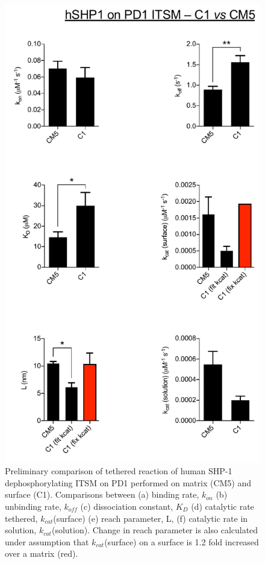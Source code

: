 \documentclass[../../AdvancementSummary.tex]{subfiles}
\begin{document}
\begin{figure}[H]
	\begin{center}
		\includegraphics[scale=0.5]{ResultsFigures/ExperimentalDataPlots/hSHP1_on_PD1_ITSM_CM5_vs_C1.pdf}
	\end{center}
	\caption{Preliminary comparison of tethered reaction of human SHP-1 dephosphorylating ITSM on PD1 performed on matrix (CM5) and surface (C1). Comparisons between (a) binding rate, $k_{on}$ (b) unbinding rate, $k_{off}$ (c) dissociation constant, $K_D$ (d) catalytic rate tethered, $k_{cat}$(surface) (e) reach parameter, L, (f) catalytic rate in solution, $k_{cat}$(solution). Change in reach parameter is also calculated under assumption that $k_{cat}$(surface) on a surface is 1.2 fold increased over a matrix (red). \label{fig: PD1Data}}
\end{figure}
\end{document}
